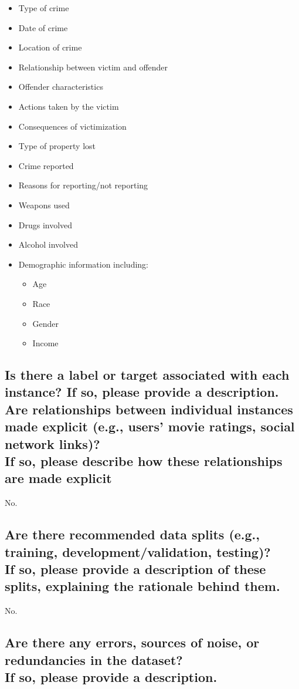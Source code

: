 \documentclass[letterpaper, 10 pt, conference]{ieeeconf}  %
\newcommand{\subtitle}[1]{{\\ \small \normalfont \color{purple} #1}}
\begin{document}
\begin{itemize}
    \item Type of crime
    \item Date of crime
    \item Location of crime
    \item Relationship between victim and offender
    \item Offender characteristics
    \item Actions taken by the victim
    \item Consequences of victimization
    \item Type of property lost
    \item Crime reported
    \item Reasons for reporting/not reporting
    \item Weapons used
    \item Drugs involved
    \item Alcohol involved
    \item Demographic information including:
    \begin{itemize}
        \item Age
        \item Race
        \item Gender
        \item Income
    \end{itemize}
\end{itemize}

\subsection{Is there a label or target associated with each instance? If so, please provide a description. Are relationships between individual instances made explicit (e.g., users’ movie ratings, social network links)? \subtitle{If so, please describe how these relationships are made explicit}}

No.

\subsection{Are there recommended data splits (e.g., training, development/validation, testing)? \subtitle{If so, please provide a description of these splits, explaining the rationale behind them.}}

No.

\subsection{Are there any errors, sources of noise, or redundancies in the dataset? \subtitle{If so, please provide a description.}}
\end{document}
